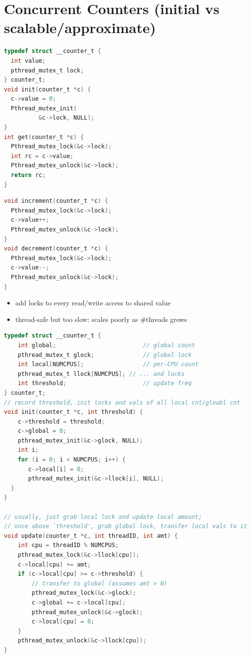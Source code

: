 \section*{Concurrent Counters (initial vs scalable/approximate)}
\begin{minipage}{.5\linewidth}
\begin{lstlisting}[language=c,xrightmargin=4pt]
typedef struct __counter_t {
  int value;
  pthread_mutex_t lock;
} counter_t;
void init(counter_t *c) {
  c->value = 0;
  Pthread_mutex_init(
          &c->lock, NULL);
}
int get(counter_t *c) {
  Pthread_mutex_lock(&c->lock);
  int rc = c->value;
  Pthread_mutex_unlock(&c->lock);
  return rc;
}
\end{lstlisting}
\end{minipage}
\begin{minipage}{.5\linewidth}
\begin{lstlisting}[language=c,xleftmargin=4pt,framextopmargin=2pt]
void increment(counter_t *c) {
  Pthread_mutex_lock(&c->lock);
  c->value++;
  Pthread_mutex_unlock(&c->lock);
}
void decrement(counter_t *c) {
  Pthread_mutex_lock(&c->lock);
  c->value--;
  Pthread_mutex_unlock(&c->lock);
}
\end{lstlisting}
  \begin{itemize}
  \item add locks to every read/write access to shared value
  \item thread-safe but too slow: scales poorly as \#threads grows
  \end{itemize}
\end{minipage}
\begin{lstlisting}[language=c]
typedef struct __counter_t {
    int global;                         // global count
    pthread_mutex_t glock;              // global lock
    int local[NUMCPUS];                 // per-CPU count
    pthread_mutex_t llock[NUMCPUS]; // ... and locks
    int threshold;                      // update freq
} counter_t;
// record threshold, init locks and vals of all local cnt/gloabl cnt
void init(counter_t *c, int threshold) {
    c->threshold = threshold;
    c->global = 0;
    pthread_mutex_init(&c->glock, NULL);
    int i;
    for (i = 0; i < NUMCPUS; i++) {
       c->local[i] = 0;
       pthread_mutex_init(&c->llock[i], NULL);
  }
}

// usually, just grab local lock and update local amount;
// once above `threshold', grab global lock, transfer local vals to it
void update(counter_t *c, int threadID, int amt) {
    int cpu = threadID % NUMCPUS;
    pthread_mutex_lock(&c->llock[cpu]);
    c->local[cpu] += amt;
    if (c->local[cpu] >= c->threshold) {
        // transfer to global (assumes amt > 0)
        pthread_mutex_lock(&c->glock);
        c->global += c->local[cpu];
        pthread_mutex_unlock(&c->glock);
        c->local[cpu] = 0;
    }
    pthread_mutex_unlock(&c->llock[cpu]);
}
\end{lstlisting}
